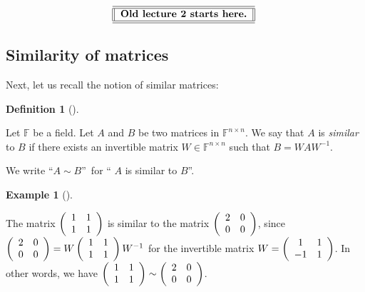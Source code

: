 \documentclass[numbers=enddot,12pt,final,onecolumn,notitlepage]{scrartcl}%
\numberwithin{exer}{subsection}
\theoremstyle{definition}
\newtheorem{defi}[theo]{Definition}
\newenvironment{definition}[1][]
{\begin{defi}[#1]\begin{leftbar}}
{\end{leftbar}\end{defi}}
\newtheorem{exam}[theo]{Example}
\newenvironment{example}[1][]
{\begin{exam}[#1]\begin{leftbar}}
{\end{leftbar}\end{exam}}
\newenvironment{noncompile}{}{}
\begin{document}
\begin{noncompile}%
\[%
\begin{tabular}
[c]{||l||}\hline\hline
\textbf{Old lecture 2 starts here.}\\\hline\hline
\end{tabular}
\
\]

\end{noncompile}

\subsection{\label{sec.schur.similar}Similarity of matrices}

Next, let us recall the notion of similar matrices:

\begin{definition}
\label{def.schurtri.similar.def}Let $\mathbb{F}$ be a field. Let $A$ and $B$
be two matrices in $\mathbb{F}^{n\times n}$. We say that $A$ is \emph{similar}
to $B$ if there exists an invertible matrix $W\in\mathbb{F}^{n\times n}$ such
that $B=WAW^{-1}$.

We write \textquotedblleft$A\sim B$\textquotedblright\ for \textquotedblleft%
$A$ is similar to $B$\textquotedblright.
\end{definition}

\begin{example}
The matrix $\left(
\begin{array}
[c]{cc}%
1 & 1\\
1 & 1
\end{array}
\right)  $ is similar to the matrix $\left(
\begin{array}
[c]{cc}%
2 & 0\\
0 & 0
\end{array}
\right)  $, since $\left(
\begin{array}
[c]{cc}%
2 & 0\\
0 & 0
\end{array}
\right)  =W\left(
\begin{array}
[c]{cc}%
1 & 1\\
1 & 1
\end{array}
\right)  W^{-1}$ for the invertible matrix $W=\left(
\begin{array}
[c]{cc}%
1 & 1\\
-1 & 1
\end{array}
\right)  $. In other words, we have $\left(
\begin{array}
[c]{cc}%
1 & 1\\
1 & 1
\end{array}
\right)  \sim\left(
\begin{array}
[c]{cc}%
2 & 0\\
0 & 0
\end{array}
\right)  $.
\end{example}
\end{document}
